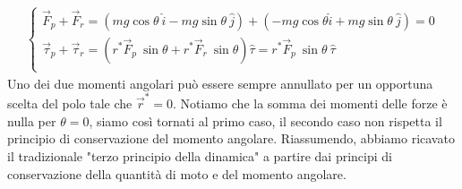 \documentclass[10pt,a4paper]{article}
\begin{document}
\begin{align*}
\begin{cases}
	\vec{F}_p+\vec{F}_r=(mg \cos\theta\ \hat{i} - mg\sin\theta\ \hat{j})+(-mg\cos\theta \hat{i}+mg\sin\theta\ \hat{j})= 0\\
	\vec{\tau}_p+\vec{\tau}_r=(r^* \vec{F}_p\ \sin\theta+r^* \vec{F}_r\ \sin\theta)\hat{\tau}= r^* \vec{F}_p\ \sin\theta\ \hat{\tau}\\
\end{cases}
\end{align*}
Uno dei due momenti angolari può essere sempre annullato per un opportuna scelta del polo tale che $\vec{r}^*=0$. Notiamo che la somma dei momenti delle forze è nulla per $\theta = 0$, siamo così tornati al primo caso, il secondo caso non rispetta il principio di conservazione del momento angolare. Riassumendo, abbiamo ricavato il tradizionale "terzo principio della dinamica" a partire dai principi di conservazione della quantità di moto e del momento angolare. 
\end{document}

